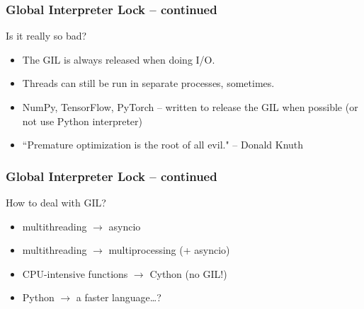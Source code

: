 \documentclass{beamer}
\begin{document}
    \begin{frame}
        \frametitle{Global Interpreter Lock -- continued}
        Is it really so bad?

        \begin{itemize}
            \item The GIL is always released when doing I/O.
            \item Threads can still be run in separate processes, sometimes.
            \item NumPy, TensorFlow, PyTorch -- written to release the GIL when possible (or not use Python interpreter)
            \item ``Premature optimization is the root of all evil." -- Donald Knuth

        \end{itemize}


    \end{frame}

    \begin{frame}
        \frametitle{Global Interpreter Lock -- continued}

        How to deal with GIL?
        \begin{itemize}
            \item multithreading $\rightarrow$ asyncio
            \item multithreading $\rightarrow$ multiprocessing (+ asyncio)
            \item CPU-intensive functions $\rightarrow$ Cython (no GIL!)
            \item Python $\rightarrow$ a faster language\dots?
        \end{itemize}

    \end{frame}

\end{document}
